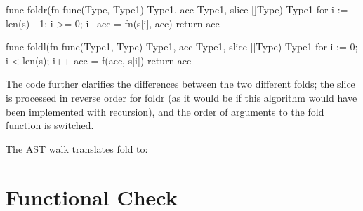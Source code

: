 \begin{code}
    \begin{gocode}
func foldr(fn func(Type, Type1) Type1, acc Type1, slice []Type) Type1 {
    for i := len(s) - 1; i >= 0; i-- {
        acc = fn(s[i], acc)
    }
    return acc
}

func foldl(fn func(Type1, Type) Type1, acc Type1, slice []Type) Type1 {
    for i := 0; i < len(s); i++ {
        acc = f(acc, s[i])
    }
    return acc
}
\end{gocode}
\end{code}

The code further clarifies the differences between the two different folds;
the slice is processed in reverse order for foldr (as it would be if this
algorithm would have been implemented with recursion), and the order of
arguments to the fold function is switched.

The AST walk translates fold to:
\begin{code}
\end{code}

\section{Functional Check}
